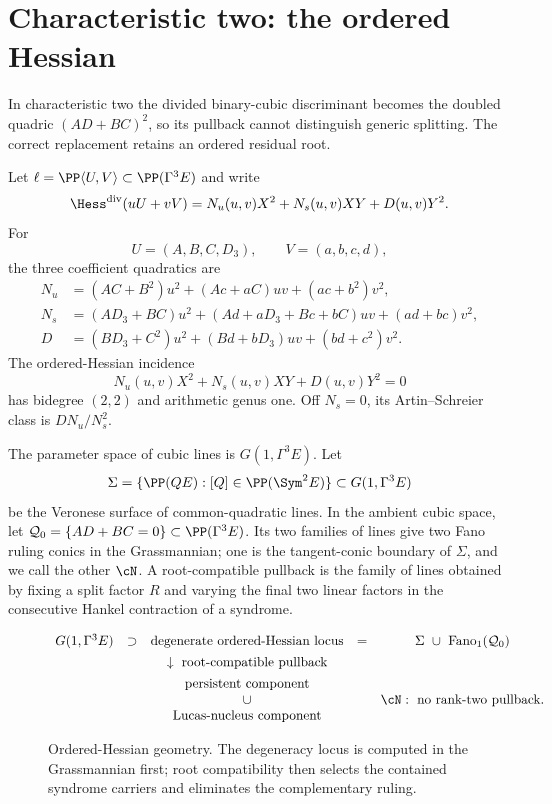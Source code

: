 \section{Characteristic two: the ordered Hessian}\label{sec:hessian}

In characteristic two the divided binary-cubic discriminant becomes
the doubled quadric $(AD+BC)^2$, so its pullback cannot distinguish
generic splitting.  The correct replacement retains an ordered
residual root.

Let $\ell=\PP\langle U,V\rangle\subset\PP(\Gamma^3E)$ and write
\[
\Hess^{\mathrm{div}}(uU+vV)
 =N_u(u,v)X^2+N_s(u,v)XY+D(u,v)Y^2.
\]
For
\[
 U=(A,B,C,D_3),\qquad V=(a,b,c,d),
\]
the three coefficient quadratics are
\[
\begin{aligned}
N_u&=(AC+B^2)u^2+(Ac+aC)uv+(ac+b^2)v^2,\\
N_s&=(AD_3+BC)u^2
 +(Ad+aD_3+Bc+bC)uv+(ad+bc)v^2,\\[-6pt]
D&=(BD_3+C^2)u^2+(Bd+bD_3)uv+(bd+c^2)v^2.
\end{aligned}
\]
The ordered-Hessian incidence
\begin{equation}\label{eq:hessian}
N_u(u,v)X^2+N_s(u,v)XY+D(u,v)Y^2=0
\end{equation}
has bidegree $(2,2)$ and arithmetic genus one.  Off $N_s=0$, its
Artin--Schreier class is $DN_u/N_s^2$.

The parameter space of cubic lines is
$G(1,\Gamma^3E)$.  Let
\[
\Sigma=\{\PP(QE):[Q]\in\PP(\Sym^2E)\}\subset G(1,\Gamma^3E)
\]
be the Veronese surface of common-quadratic lines.  In the ambient
cubic space, let $\mathcal Q_0=\{AD+BC=0\}\subset\PP(\Gamma^3E)$.
Its two families of lines give two Fano ruling conics in the
Grassmannian; one is the tangent-conic boundary of $\Sigma$, and we
call the other $\cN$.  A root-compatible pullback is the family of
lines obtained by fixing a split factor $R$ and varying the final two
linear factors in the consecutive Hankel contraction of a syndrome.

\begin{figure}[H]
\centering
\[
\begin{array}{ccccc}
G(1,\Gamma^3E)
&\supset&
\text{degenerate ordered-Hessian locus}
&=&
\Sigma\ \cup\ \operatorname{Fano}_1(\mathcal Q_0)\\[4pt]
&&\downarrow\ \text{root-compatible pullback}&&\\[4pt]
&&
\begin{array}{c}
\text{persistent component}\\
\cup\\
\text{Lucas-nucleus component}
\end{array}
&&
\cN:\ \text{no rank-two pullback}.
\end{array}
\]
\caption{Ordered-Hessian geometry.  The degeneracy locus is computed
in the Grassmannian first; root compatibility then selects the
contained syndrome carriers and eliminates the complementary ruling.}
\label{fig:hessian-flow}
\end{figure}

